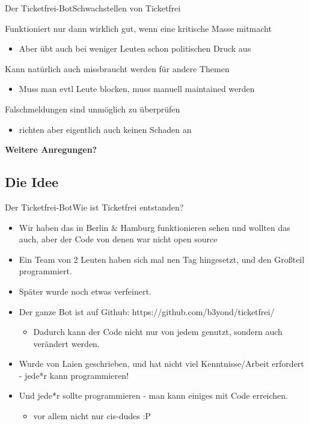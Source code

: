\documentclass[10pt]{beamer}
\begin{document}
{\begin{frame}{Der Ticketfrei-Bot}{Schwachstellen von Ticketfrei}
\begin{block}{Funktioniert nur dann wirklich gut, wenn eine kritische Masse mitmacht}
  \begin{itemize}
    \item Aber übt auch bei weniger Leuten schon politischen Druck aus
  \end{itemize}
\end{block}

\begin{block}{Kann natürlich auch missbraucht werden für andere Themen}
  \begin{itemize}
    \item Muss man evtl Leute blocken, muss manuell maintained werden
  \end{itemize}
\end{block}

\begin{block}{Falschmeldungen sind unmöglich zu überprüfen}
  \begin{itemize}
    \item richten aber eigentlich auch keinen Schaden an
  \end{itemize}
\end{block}

\textbf{Weitere Anregungen?}

\end{frame}

\subsection{Die Idee}
\begin{frame}{Der Ticketfrei-Bot}{Wie ist Ticketfrei entstanden?}

\begin{itemize}
    \item<1-> Wir haben das in Berlin \& Hamburg funktionieren sehen und wollten das auch, aber der Code von denen war nicht open source
    \item<1-> Ein Team von 2 Leuten haben sich mal nen Tag hingesetzt, und den Großteil programmiert.
    \item<1-> Später wurde noch etwas verfeinert.
    \item<2-> Der ganze Bot ist auf Github: https://github.com/b3yond/ticketfrei/
  \begin{itemize}
    \item Dadurch kann der Code nicht nur von jedem genutzt, sondern auch verändert werden.
  \end{itemize}
    \item<2-> Wurde von Laien geschrieben, und hat nicht viel Kenntnisse/Arbeit erfordert - jede*r kann programmieren!
	\item<2-> Und jede*r sollte programmieren - man kann einiges mit Code erreichen.
  \begin{itemize}
    \item vor allem nicht nur cis-dudes :P
  \end{itemize}
\end{itemize}
    


\end{frame}}
\end{document}
